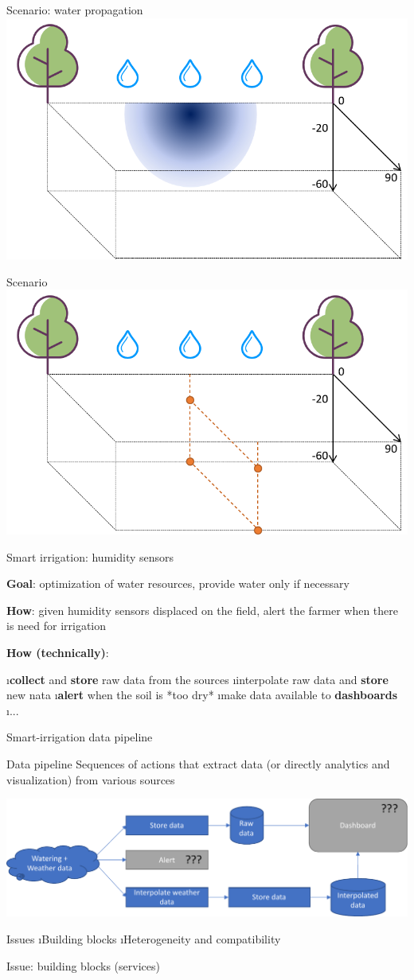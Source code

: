 \begin{frame}{Scenario: water propagation}
\includegraphics[width=.6\textwidth]{imgs/casestudy.png}
\end{frame}

\begin{frame}{Scenario}
\includegraphics[width=.6\textwidth]{imgs/casestudy_sensors.png}
\end{frame}

\begin{frame}{Smart irrigation: humidity sensors}

\textbf{Goal}: optimization of water resources, provide water only if necessary

\textbf{How}: given humidity sensors displaced on the field, alert the farmer when there is need for irrigation

\textbf{How (technically)}:

\i \textbf{collect} and \textbf{store} raw data from the sources
\i interpolate raw data and \textbf{store} new nata
\i \textbf{alert} when the soil is *too dry*
\i make data available to \textbf{dashboards}
\i ...

\end{frame}

\begin{frame}{Smart-irrigation data pipeline}

\begin{block}{Data pipeline}
Sequences of actions that extract data (or directly analytics and visualization) from various sources
\end{block}

\includegraphics[width=\linewidth]{imgs/pipeline.pdf}
\end{frame}

\begin{frame}{Issues}
\i Building blocks
\i Heterogeneity and compatibility
\end{frame}

\begin{frame}{Issue: building blocks (services)}

\end{frame}